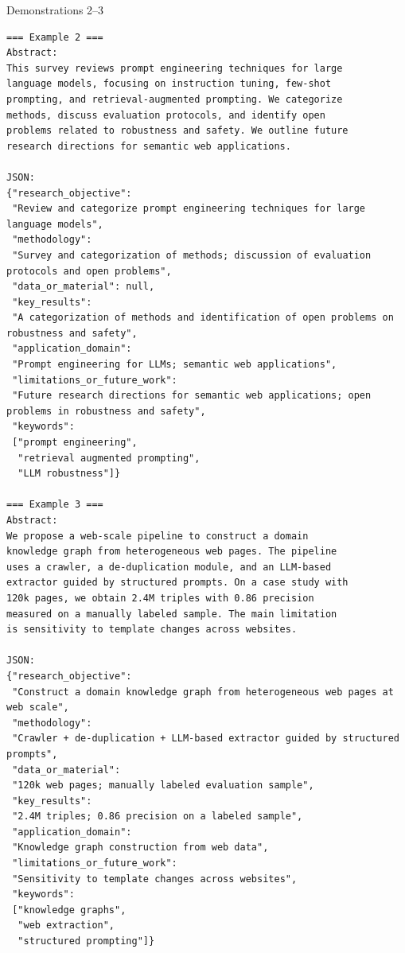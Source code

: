 \documentclass[fleqn,10pt]{wlscirep-authoryear}
\begin{document}
\begin{promptbox}{Demonstrations 2--3}
\begin{lstlisting}[style=promptstyle]
=== Example 2 ===
Abstract:
This survey reviews prompt engineering techniques for large
language models, focusing on instruction tuning, few-shot
prompting, and retrieval-augmented prompting. We categorize
methods, discuss evaluation protocols, and identify open
problems related to robustness and safety. We outline future
research directions for semantic web applications.

JSON:
{"research_objective":
 "Review and categorize prompt engineering techniques for large language models",
 "methodology":
 "Survey and categorization of methods; discussion of evaluation protocols and open problems",
 "data_or_material": null,
 "key_results":
 "A categorization of methods and identification of open problems on robustness and safety",
 "application_domain":
 "Prompt engineering for LLMs; semantic web applications",
 "limitations_or_future_work":
 "Future research directions for semantic web applications; open problems in robustness and safety",
 "keywords":
 ["prompt engineering",
  "retrieval augmented prompting",
  "LLM robustness"]}

=== Example 3 ===
Abstract:
We propose a web-scale pipeline to construct a domain
knowledge graph from heterogeneous web pages. The pipeline
uses a crawler, a de-duplication module, and an LLM-based
extractor guided by structured prompts. On a case study with
120k pages, we obtain 2.4M triples with 0.86 precision
measured on a manually labeled sample. The main limitation
is sensitivity to template changes across websites.

JSON:
{"research_objective":
 "Construct a domain knowledge graph from heterogeneous web pages at web scale",
 "methodology":
 "Crawler + de-duplication + LLM-based extractor guided by structured prompts",
 "data_or_material":
 "120k web pages; manually labeled evaluation sample",
 "key_results":
 "2.4M triples; 0.86 precision on a labeled sample",
 "application_domain":
 "Knowledge graph construction from web data",
 "limitations_or_future_work":
 "Sensitivity to template changes across websites",
 "keywords":
 ["knowledge graphs",
  "web extraction",
  "structured prompting"]}
\end{lstlisting}
\end{promptbox}
\end{document}
